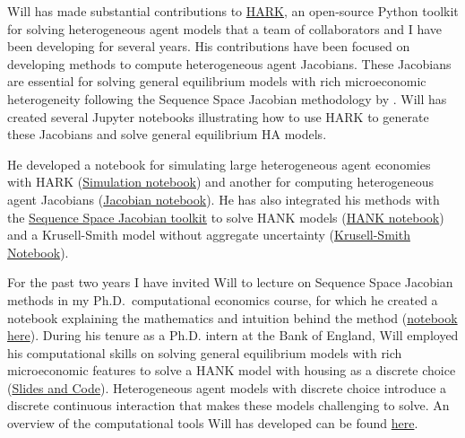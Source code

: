 \documentclass[\econtexRoot/Letter]{subfiles}
\begin{document}
\notinsubfile{\renewcommand{\econtexRoot}{.}}



Will has made substantial contributions to \href{https://github.com/econ-ark/HARK}{HARK}, an open-source Python toolkit for solving heterogeneous agent models that a team of collaborators and I have been developing for several years.  His contributions have been focused on developing methods to compute heterogeneous agent Jacobians. These Jacobians are essential for solving general equilibrium models with rich microeconomic heterogeneity following the Sequence Space Jacobian methodology by \cite{Auclert2021}.
Will has created several Jupyter notebooks illustrating how to use HARK to generate these Jacobians and solve general equilibrium HA models. %

He developed a notebook for simulating large heterogeneous agent economies with HARK (\href{https://github.com/econ-ark/HARK/blob/master/examples/ConsNewKeynesianModel/Transition_Matrix_Example.ipynb}{Simulation notebook}) and another for computing heterogeneous agent Jacobians (\href{https://github.com/econ-ark/HARK/blob/master/examples/ConsNewKeynesianModel/Jacobian_Example.ipynb}{Jacobian notebook}). He has also integrated his methods with the \href{https://github.com/shade-econ/sequence-jacobian}{Sequence Space Jacobian toolkit} to solve HANK models (\href{https://github.com/econ-ark/HARK/blob/master/examples/ConsNewKeynesianModel/SSJ_example.ipynb}{HANK notebook}) and a Krusell-Smith model without aggregate uncertainty (\href{https://github.com/econ-ark/HARK/blob/master/examples/ConsNewKeynesianModel/KS-HARK-presentation.ipynb}{Krusell-Smith Notebook}).

For the past two years I have invited Will to lecture on Sequence Space Jacobian methods in my Ph.D.\ computational economics course, for which he created a notebook explaining the mathematics and intuition behind the method (\href{https://github.com/econ-ark/HARK/blob/master/examples/ConsNewKeynesianModel/SSJ_explanation.ipynb}{notebook here}). During his tenure as a Ph.D. intern at the Bank of England, Will employed his computational skills on solving general equilibrium models with rich microeconomic features to solve a HANK model with housing as a discrete choice (\href{https://github.com/wdu9/HANK_Housing_Block}{Slides and Code}). Heterogeneous agent models with discrete choice introduce a discrete continuous interaction that makes these models challenging to solve. An overview of the computational tools Will has developed can be found \href{https://www.william-du.com/computational-tools}{here}.
\end{document}
